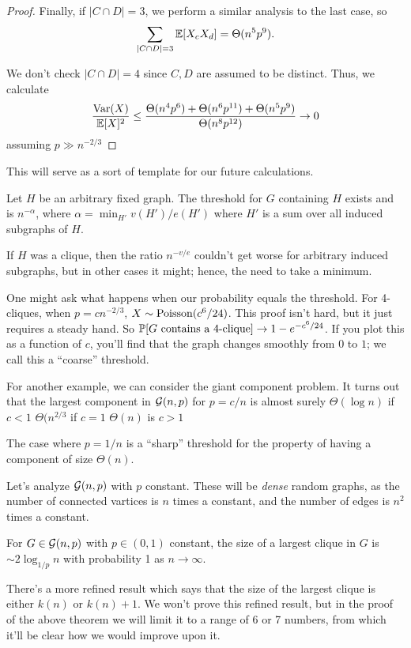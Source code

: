 \documentclass[11 pt]{scrartcl}
\begin{document}
\begin{example}
\begin{proof}
        Finally, if $|C \cap D| = 3$, we perform a similar analysis to the last case, so 
        \[ \sum_{|C\cap D| = 3} \mathbb E[X_cX_d] = \Theta(n^5p^9).\] 

        We don't check $|C\cap D| = 4$ since $C,D$ are assumed to be distinct. Thus, we calculate 
        \[ \dfrac{\text{Var}(X)}{\mathbb E[X]^2} \leq \dfrac{\Theta(n^4p^6) + \Theta(n^6p^{11}) + \Theta(n^5p^9)}{\Theta(n^8p^{12})} \to 0\] 
        assuming $p \gg n^{-2/3}$
    \end{proof}
\end{example}

This will serve as a sort of template for our future calculations. 

\begin{example}
    Let $H$ be an arbitrary fixed graph. The threshold for $G$ containing $H$ exists and is $n^{-\alpha}$, where $\alpha = \min_{H'} v(H')/e(H')$ where $H'$ is a sum over all induced subgraphs of $H$. 

    If $H$ was a clique, then the ratio $n^{-v/e}$ couldn't get worse for arbitrary induced subgraphs, but in other cases it might; hence, the need to take a minimum. 
\end{example}

One might ask what happens when our probability equals the threshold. For 4-cliques, when $p = cn^{-2/3}$, $X\sim \text{Poisson}(c^6/24)$. This proof isn't hard, but it just requires a steady hand. So $\mathbb P[G\text{ contains a 4-clique}] \to 1-e^{-c^6/24}$. If you plot this as a function of $c$, you'll find that the graph changes smoothly from $0$ to $1$; we call this a ``coarse'' threshold.  

For another example, we can consider the giant component problem. It turns out that the largest component in $\mathcal G(n,p)$ for $p = c/n$ is almost surely 
\itemnum
    \ii $\Theta(\log n)$ if $c < 1$ 
    \ii $\Theta(n^{2/3}$ if $c = 1$ 
    \ii $\Theta(n)$ is $c > 1$
\itemend

The case where $p = 1/n$ is a ``sharp'' threshold for the property of having a component of size $\Theta(n)$. 

Let's analyze $\mathcal G(n,p)$ with $p$ constant. These will be \emph{dense} random graphs, as the number of connected vartices is $n$ times a constant, and the number of edges is $n^2$ times a constant. 
\begin{theorem}
    For $G \in \mathcal G(n,p)$ with $p \in (0,1)$ constant, the size of a largest clique in $G$ is $\sim 2\log_{1/p} n$ with probability 1 as $n\to\infty$. 
\end{theorem}
There's a more refined result which says that the size of the largest clique is either $k(n)$ or $k(n) + 1$. We won't prove this refined result, but in the proof of the above theorem we will limit it to a range of 6 or 7 numbers, from which it'll be clear how we would improve upon it. 
\end{document}
